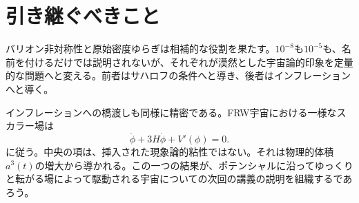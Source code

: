 \section{引き継ぐべきこと}

バリオン非対称性と原始密度ゆらぎは相補的な役割を果たす。\(10^{-8}\)も\(10^{-5}\)も、名前を付けるだけでは説明されないが、それぞれが漠然とした宇宙論的印象を定量的な問題へと変える。前者はサハロフの条件へと導き、後者はインフレーションへと導く。

インフレーションへの橋渡しも同様に精密である。FRW宇宙における一様なスカラー場は
\[
\ddot\phi+3H\dot\phi+V'(\phi)=0.
\]
に従う。中央の項は、挿入された現象論的粘性ではない。それは物理的体積\(a^3(t)\)の増大から導かれる。この一つの結果が、ポテンシャルに沿ってゆっくりと転がる場によって駆動される宇宙についての次回の講義の説明を組織するであろう。